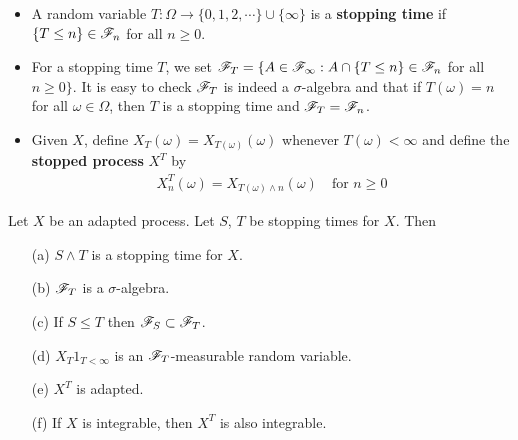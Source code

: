\documentclass[10pt,a4paper]{report}
\begin{document}
\begin{itemize}
\item A random variable $T:\Omega \rightarrow \{ 0,1,2,\cdots \} \cup \{\infty\}$ is a \textbf{stopping time} if $\{ T\leq n\}\in \mathscr{F}_n$ for all $n \geq 0$.

\item For a stopping time $T$, we set $\mathscr{F}_T = \{ A\in \mathscr{F}_{\infty} : A\cap \{ T\leq n \} \in \mathscr{F}_n$ for all $n\geq 0 \}$. It is easy to check $\mathscr{F}_T$ is indeed a $\sigma$-algebra and that if $T(\omega) = n$ for all $\omega \in \Omega$, then $T$ is a stopping time and $\mathscr{F}_T = \mathscr{F}_n$.

\item Given $X$, define $X_T(\omega) = X_{T(\omega)}(\omega)$ whenever $T(\omega) <\infty$ and define the \textbf{stopped process} $X^T$ by
\begin{align*}
X_n^T (\omega)  = X_{T(\omega) \wedge n} (\omega) \quad \text{for } n\geq 0
\end{align*}
\end{itemize}

 Let $X$ be an adapted process. Let $S$, $T$ be stopping times for $X$. Then
\begin{itemize}
\item[(a)] $S\wedge T$ is a stopping time for $X$.
\item[(b)] $\mathscr{F}_T$ is a $\sigma$-algebra.
\item[(c)] If $S\leq T$ then $\mathscr{F}_S \subset \mathscr{F}_T$.
\item[(d)] $X_T 1_{T<\infty}$ is an $\mathscr{F}_T$-measurable random variable.
\item[(e)] $X^T$ is adapted.
\item[(f)] If $X$ is integrable, then $X^T$ is also integrable.
\end{itemize}
\end{document}
